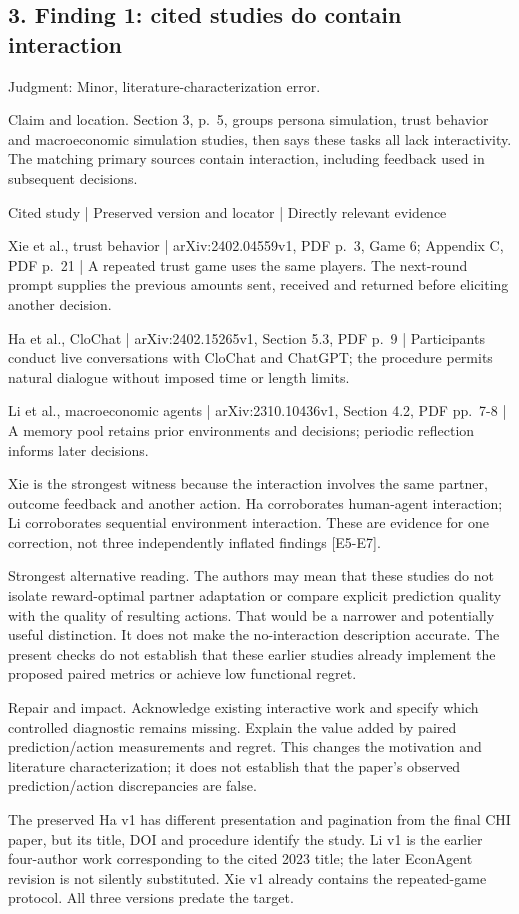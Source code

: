 \documentclass[10pt]{article}
\begin{document}
\subsection*{3. Finding 1: cited studies do contain interaction}
Judgment: Minor, literature-characterization error.\par
Claim and location. Section 3, p. 5, groups persona simulation, trust behavior and macroeconomic simulation studies, then says these tasks all lack interactivity. The matching primary sources contain interaction, including feedback used in subsequent decisions.\par
Cited study | Preserved version and locator | Directly relevant evidence\par
Xie et al., trust behavior | arXiv:2402.04559v1, PDF p. 3, Game 6; Appendix C, PDF p. 21 | A repeated trust game uses the same players. The next-round prompt supplies the previous amounts sent, received and returned before eliciting another decision.\par
Ha et al., CloChat | arXiv:2402.15265v1, Section 5.3, PDF p. 9 | Participants conduct live conversations with CloChat and ChatGPT; the procedure permits natural dialogue without imposed time or length limits.\par
Li et al., macroeconomic agents | arXiv:2310.10436v1, Section 4.2, PDF pp. 7-8 | A memory pool retains prior environments and decisions; periodic reflection informs later decisions.\par
Xie is the strongest witness because the interaction involves the same partner, outcome feedback and another action. Ha corroborates human-agent interaction; Li corroborates sequential environment interaction. These are evidence for one correction, not three independently inflated findings [E5-E7].\par
Strongest alternative reading. The authors may mean that these studies do not isolate reward-optimal partner adaptation or compare explicit prediction quality with the quality of resulting actions. That would be a narrower and potentially useful distinction. It does not make the no-interaction description accurate. The present checks do not establish that these earlier studies already implement the proposed paired metrics or achieve low functional regret.\par
Repair and impact. Acknowledge existing interactive work and specify which controlled diagnostic remains missing. Explain the value added by paired prediction/action measurements and regret. This changes the motivation and literature characterization; it does not establish that the paper’s observed prediction/action discrepancies are false.\par
The preserved Ha v1 has different presentation and pagination from the final CHI paper, but its title, DOI and procedure identify the study. Li v1 is the earlier four-author work corresponding to the cited 2023 title; the later EconAgent revision is not silently substituted. Xie v1 already contains the repeated-game protocol. All three versions predate the target.\par
\end{document}
